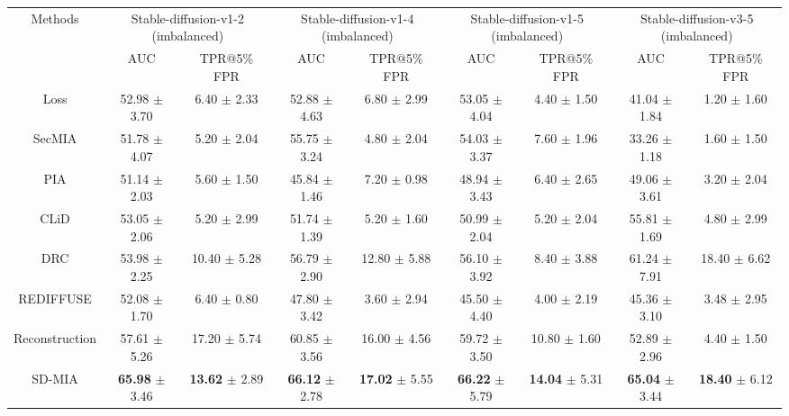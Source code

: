 \begin{table}[ht]
{\begin{tabular}{c|cc|cc|cc|cc}
\\ \midrule  \midrule
\multirow{2}{*}{Methods} & \multicolumn{2}{c|}{Stable-diffusion-v1-2 (imbalanced)} & \multicolumn{2}{c|}{Stable-diffusion-v1-4 (imbalanced)} & \multicolumn{2}{c|}{Stable-diffusion-v1-5 (imbalanced)}  & \multicolumn{2}{c}{Stable-diffusion-v3-5 (imbalanced)} \\
                         & AUC          & TPR@5\% FPR         & AUC          & TPR@5\% FPR         & AUC          & TPR@5\% FPR         & AUC          & TPR@5\% FPR        \\ \midrule
Loss & 52.98 $\pm$ 3.70 & 6.40 $\pm$ 2.33 & 52.88 $\pm$ 4.63 & 6.80 $\pm$ 2.99 & 53.05 $\pm$ 4.04 & 4.40 $\pm$ 1.50 & 41.04 $\pm$ 1.84 & 1.20 $\pm$ 1.60 \\
SecMIA & 51.78 $\pm$ 4.07 & 5.20 $\pm$ 2.04 & 55.75 $\pm$ 3.24 & 4.80 $\pm$ 2.04 & 54.03 $\pm$ 3.37 & 7.60 $\pm$ 1.96 & 33.26 $\pm$ 1.18 & 1.60 $\pm$ 1.50 \\
PIA & 51.14 $\pm$ 2.03 & 5.60 $\pm$ 1.50 & 45.84 $\pm$ 1.46 & 7.20 $\pm$ 0.98 & 48.94 $\pm$ 3.43 & 6.40 $\pm$ 2.65 & 49.06 $\pm$ 3.61 & 3.20 $\pm$ 2.04 \\
CLiD & 53.05 $\pm$ 2.06 & 5.20 $\pm$ 2.99 & 51.74 $\pm$ 1.39 & 5.20 $\pm$ 1.60 & 50.99 $\pm$ 2.04 & 5.20 $\pm$ 2.04 & 55.81 $\pm$ 1.69 & 4.80 $\pm$ 2.99 \\
DRC & 53.98 $\pm$ 2.25 & 10.40 $\pm$ 5.28 & 56.79 $\pm$ 2.90 & 12.80 $\pm$ 5.88 & 56.10 $\pm$ 3.92 & 8.40 $\pm$ 3.88 & 61.24 $\pm$ 7.91 & 18.40 $\pm$ 6.62 \\ \midrule
REDIFFUSE & 52.08 $\pm$ 1.70 & 6.40 $\pm$ 0.80 & 47.80 $\pm$ 3.42 & 3.60 $\pm$ 2.94 & 45.50 $\pm$ 4.40 & 4.00 $\pm$ 2.19 & 45.36 $\pm$ 3.10 & 3.48 $\pm$ 2.95 \\
Reconstruction  & 57.61 $\pm$ 5.26 & 17.20 $\pm$ 5.74 & 60.85 $\pm$ 3.56 & 16.00 $\pm$ 4.56 & 59.72 $\pm$ 3.50 & 10.80 $\pm$ 1.60 & 52.89 $\pm$ 2.96 & 4.40 $\pm$ 1.50 \\
SD-MIA  & \cellcolor{gray!30} \textbf{65.98} $\pm$ 3.46 & \cellcolor{gray!30} \textbf{13.62} $\pm$ 2.89 & \cellcolor{gray!30} \textbf{66.12} $\pm$ 2.78 & \cellcolor{gray!30} \textbf{17.02} $\pm$ 5.55 & \cellcolor{gray!30} \textbf{66.22} $\pm$ 5.79 & \cellcolor{gray!30} \textbf{14.04} $\pm$ 5.31 & \cellcolor{gray!30}  \textbf{65.04} $\pm$ 3.44 & \cellcolor{gray!30} \textbf{18.40} $\pm$ 6.12 \\
\bottomrule
\end{tabular}
}
\end{table}

